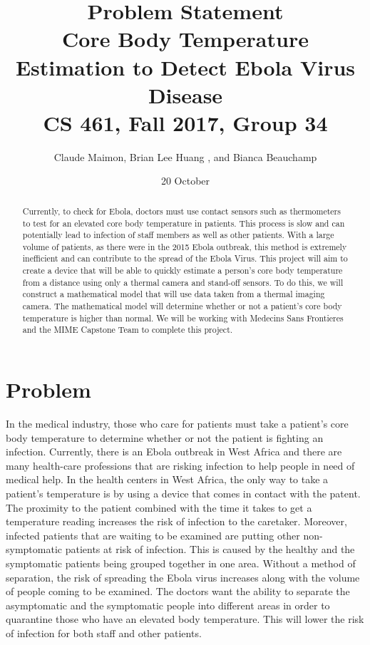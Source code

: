 \documentclass{article}
\title{%
  Problem Statement \\
  \vspace{0.4cm}
  \large Core Body Temperature Estimation to Detect Ebola Virus Disease \\
  \vspace{0.4cm}
  \large CS 461, Fall 2017, Group 34\\
    }
\author{Claude Maimon,  Brian Lee Huang , and Bianca Beauchamp}
\date{ 20 October}
\begin{document}
\maketitle


\begin{abstract}
Currently, to check for Ebola, doctors must use contact sensors such as thermometers to test for an elevated core body temperature in patients. This process is slow and can potentially lead to infection of staff members as well as other patients. With a large volume of patients, as there were in the 2015 Ebola outbreak, this method is extremely inefficient and can contribute to the spread of the Ebola Virus. This project will aim to create a device that will be able to quickly estimate a person’s core body temperature from a distance using only a thermal camera and stand-off sensors. To do this, we will construct a mathematical model that will use data taken from a thermal imaging camera. The mathematical model will determine whether or not a patient’s core body temperature is higher than normal. We will be working with Medecins Sans Frontieres and the MIME Capstone Team to complete this project.
   \end{abstract}
\newpage
\section{Problem}
In the medical industry, those who care for patients must take a patient’s core body temperature to determine whether or not the patient is fighting an infection. Currently, there is an Ebola outbreak in West Africa and there are many health-care professions that are risking infection to help people in need of medical help. In the health centers in West Africa, the only way to take a patient's temperature is by using a device that comes in contact with the patent. The proximity to the patient combined with the time it takes to get a temperature reading increases the risk of infection to the caretaker. Moreover, infected patients that are waiting to be examined are putting other non-symptomatic patients at risk of infection. This is caused by the healthy and the symptomatic patients being grouped together in one area. Without a method of separation, the risk of spreading the Ebola virus increases along with the volume of people coming to be examined. The doctors want the ability to separate the asymptomatic and the symptomatic people into different areas in order to quarantine those who have an elevated body temperature. This will lower the risk of infection for both staff and other patients. 
\end{document}
